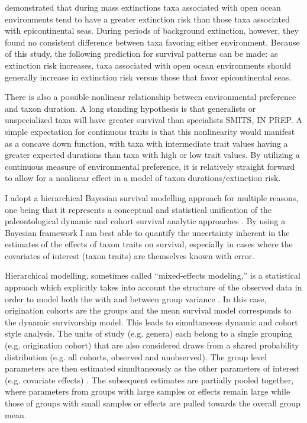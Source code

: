 \documentclass[12pt,letterpaper]{article}
\begin{document}
\citet{Miller2009a} demonstrated that during mass extinctions taxa associated with open ocean environments tend to have a greater extinction risk than those taxa associated with epicontinental seas. During periods of background extinction, however, they found no consistent difference between taxa favoring either environment. Because of this study, the following prediction for survival patterns can be made: as extinction risk increases, taxa associated with open ocean environments should generally increase in extinction risk versus those that favor epicontinental seas.

There is also a possible nonlinear relationship between environmental preference and taxon duration. A long standing hypothesis is that generalists or unspecialized taxa will have greater survival than specialists \citep{Simpson1944,Liow2004a,Liow2007b,Nurnberg2013a,Nurnberg2015,Baumiller1993} \uppercase{Smits, in prep}. A simple expectation for continuous traits is that this nonlinearity would manifest as a concave down function, with taxa with intermediate trait values having a greater expected durations than taxa with high or low trait values. By utilizing a continuous measure of environmental preference, it is relatively straight forward to allow for a nonlinear effect in a model of taxon durations/extinction risk.

I adopt a hierarchical Bayesian survival modelling approach for multiple reasons, one being that it represents a conceptual and statistical unification of the paleontological dynamic and cohort survival analytic approaches \citep{VanValen1973,VanValen1979,Raup1978,Raup1975,Foote1988,Baumiller1993,Simpson2006}. By using a Bayesian framework I am best able to quantify the uncertainty inherent in the estimates of the effects of taxon traits on survival, especially in cases where the covariates of interest (taxon traits) are themselves known with error. 

Hierarchical modelling, sometimes called ``mixed-effects modeling,'' is a statistical approach which explicitly takes into account the structure of the observed data in order to model both the with and between group variance \citep{Gelman2013d,Gelman2007}. In this case, origination cohorts are the groups and the mean survival model corresponds to the dynamic survivorship model. This leads to simultaneous dynamic and cohort style analysis. The units of study (e.g. genera) each belong to a single grouping (e.g. origination cohort) that are also considered draws from a shared probability distribution (e.g. all cohorts, observed and unobserved). The group level parameters are then estimated simultaneously as the other parameters of interest (e.g. covariate effects) \citep{Gelman2013d}. The subsequent estimates are partially pooled together, where parameters from groups with large samples or effects remain large while those of groups with small samples or effects are pulled towards the overall group mean. 
\end{document}
